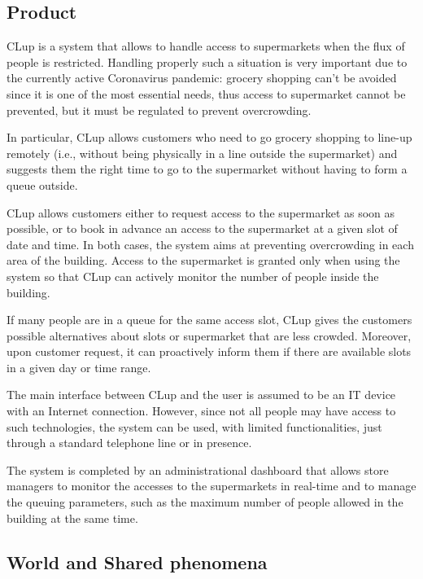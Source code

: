 \documentclass[../../main.tex]{subfiles}
\begin{document}
\subsection{Product}

CLup is a system that allows to handle access to supermarkets when the flux of
people is restricted. Handling properly such a situation is very important due
to the currently active Coronavirus pandemic: grocery shopping can't be avoided
since it is one of the most essential needs, thus access to supermarket cannot
be prevented, but it must be regulated to prevent overcrowding.

In particular, CLup allows customers who need to go grocery shopping to line-up
remotely (i.e., without being physically in a line outside the supermarket) and
suggests them the right time to go to the supermarket without having to form a
queue outside.

CLup allows customers either to request access to the supermarket as soon as
possible, or to book in advance an access to the supermarket at a given slot of
date and time. In both cases, the system aims at preventing overcrowding in each
area of the building. Access to the supermarket is granted only when using the
system so that CLup can actively monitor the number of people inside the
building.

If many people are in a queue for the same access slot, CLup gives the customers
possible alternatives about slots or supermarket that are less crowded.
Moreover, upon customer request, it can proactively inform them if there are
available slots in a given day or time range.

The main interface between CLup and the user is assumed to be an IT device with
an Internet connection. However, since not all people may have access to such
technologies, the system can be used, with limited functionalities, just through
a standard telephone line or in presence.

The system is completed by an administrational dashboard that allows store
managers to monitor the accesses to the supermarkets in real-time and to manage
the queuing parameters, such as the maximum number of people allowed in the
building at the same time.

\subsection{World and Shared phenomena}

\end{document}
